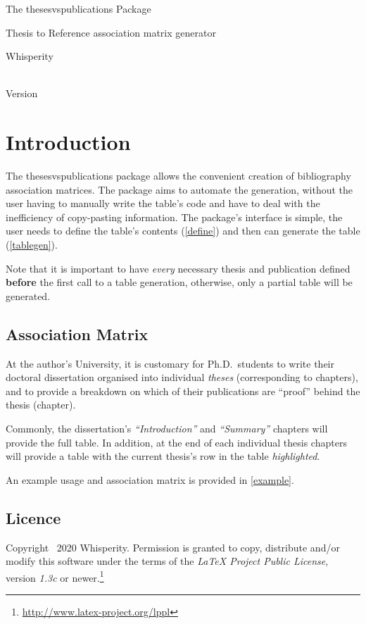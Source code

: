\documentclass{article}
\begin{document}
\vspace*{0in}
\begin{center}
    \LARGE The \textsf{thesesvspublications} Package \\
    \small \rule{0in}{1em} Thesis to Reference association matrix generator \\
    \large \rule{0in}{2em} Whisperity \\
    \rule{0em}{2em}\thesesvspublicationsReleaseDate \\
    Version \thesesvspublicationsVersion
\end{center}


\section{Introduction}\label{intro}
The \textsf{thesesvspublications} package allows the convenient creation of bibliography association matrices.
The package aims to automate the generation, without the user having to manually write the table's code and have to deal with the inefficiency of copy-pasting information.
The package's interface is simple, the user needs to define the table's contents (\cref{define}) and then can generate the table (\cref{tablegen}).

Note that it is important to have \emph{every} necessary thesis and publication defined \textbf{before} the first call to a table generation, otherwise, only a partial table will be generated.

\subsection{Association Matrix}\label{association-mx}
At the author's University, it is customary for Ph.D.\ students to write their doctoral dissertation organised into individual \emph{theses} (corresponding to chapters), and to provide a breakdown on which of their publications are ``proof'' behind the thesis (chapter).

Commonly, the dissertation's \emph{``Introduction''} and \emph{``Summary''} chapters will provide the full table.
In addition, at the end of each individual thesis chapters will provide a table with the current thesis's row in the table \emph{highlighted}.

An example usage and association matrix is provided in \cref{example}.


\subsection{Licence}
Copyright \textcopyright\ 2020 Whisperity.
Permission is granted to copy, distribute and\slash or modify this software under the terms of the \emph{\LaTeX{} Project Public License}, version \emph{1.3c} or newer.\footnote{%
    \url{http://www.latex-project.org/lppl}%
}
\end{document}
